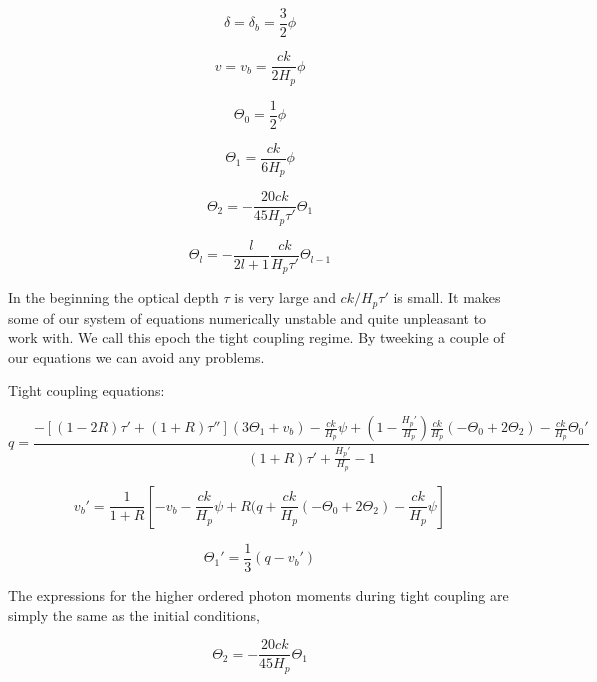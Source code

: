 \documentclass[norsk,a4paper,12pt]{article}
\begin{document}
\begin{equation}
 \delta = \delta_b = \frac{3}{2}\phi
\end{equation}

\begin{equation}
 v = v_b = \frac{ck}{2H_p}\phi
\end{equation}

\begin{equation}
 \Theta_0 = \frac{1}{2}\phi
\end{equation}

\begin{equation}
 \Theta_1 = \frac{ck}{6H_p}\phi
\end{equation}

\begin{equation}
 \Theta_2 = -\frac{20ck}{45H_p\tau'}\Theta_1
\end{equation}

\begin{equation}
 \Theta_l = -\frac{l}{2l + 1}\frac{ck}{H_p\tau'}\Theta_{l-1}
\end{equation}

In the beginning the optical depth $\tau$ is very large and $ck/H_p\tau'$ is small. It makes some of our system of equations numerically unstable and quite unpleasant to work with. We call this epoch the tight coupling regime. By tweeking a couple of our equations we can avoid any problems.

Tight coupling equations:

\begin{equation}
 q = \frac{-[(1-2R)\tau' + (1+R)\tau''](3\Theta_1 + v_b) - \frac{ck}{H_p}\psi + (1-\frac{H_p'}{H_p})\frac{ck}{H_p}(-\Theta_0 + 2\Theta_2) - \frac{ck}{H_p}\Theta_0'}{(1+R)\tau' + \frac{H_p'}{H_p}-1}
\end{equation}

\begin{equation}
 v_b' = \frac{1}{1 + R}[-v_b-\frac{ck}{H_p}\psi + R(q + \frac{ck}{H_p}(-\Theta_0 + 2\Theta_2) -\frac{ck}{H_p}\psi]
\end{equation}

\begin{equation}
 \Theta_1' = \frac{1}{3}(q-v_b')
\end{equation}

The expressions for the higher ordered photon moments during tight coupling are simply the same as the initial conditions,

\begin{equation}
 \Theta_2 = -\frac{20ck}{45H_p}\Theta_1
\end{equation}
\end{document}
